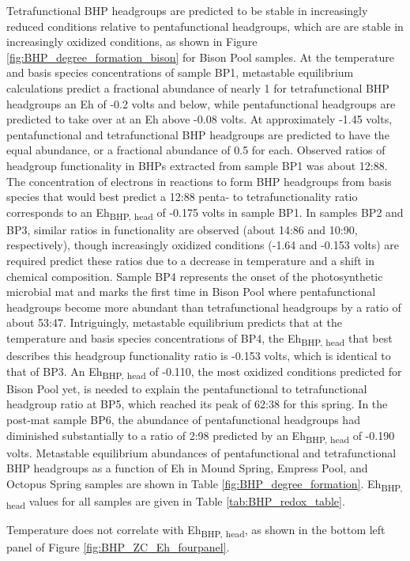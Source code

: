 Tetrafunctional BHP headgroups are predicted to be stable in increasingly reduced conditions relative to pentafunctional headgroups, which are are stable in increasingly oxidized conditions, as shown in Figure \ref{fig:BHP_degree_formation_bison} for Bison Pool samples. At the temperature and basis species concentrations of sample BP1, metastable equilibrium calculations predict a fractional abundance of nearly 1 for tetrafunctional BHP headgroups an Eh of -0.2 volts and below, while pentafunctional headgroups are predicted to take over at an Eh above -0.08 volts. At approximately -1.45 volts, pentafunctional and tetrafunctional BHP headgroups are predicted to have the equal abundance, or a fractional abundance of 0.5 for each. Observed ratios of headgroup functionality in BHPs extracted from sample BP1 was about 12:88. The concentration of electrons in reactions to form BHP headgroups from basis species that would best predict a 12:88 penta- to tetrafunctionality ratio corresponds to an Eh\textsubscript{BHP, head} of -0.175 volts in sample BP1. In samples BP2 and BP3, similar ratios in functionality are observed (about 14:86 and 10:90, respectively), though increasingly oxidized conditions (-1.64 and -0.153 volts) are required predict these ratios due to a decrease in temperature and a shift in chemical composition. Sample BP4 represents the onset of the photosynthetic microbial mat and marks the first time in Bison Pool where pentafunctional headgroups become more abundant than tetrafunctional headgroups by a ratio of about 53:47. Intriguingly, metastable equilibrium predicts that at the temperature and basis species concentrations of BP4, the Eh\textsubscript{BHP, head} that best describes this headgroup functionality ratio is -0.153 volts, which is identical to that of BP3. An Eh\textsubscript{BHP, head} of -0.110, the most oxidized conditions predicted for Bison Pool yet, is needed to explain the pentafunctional to tetrafunctional headgroup ratio at BP5, which reached its peak of 62:38 for this spring. In the post-mat sample BP6, the abundance of pentafunctional headgroups had diminished substantially to a ratio of 2:98 predicted by an Eh\textsubscript{BHP, head} of -0.190 volts. Metastable equilibrium abundances of pentafunctional and tetrafunctional BHP headgroups as a function of Eh in Mound Spring, Empress Pool, and Octopus Spring samples are shown in Table \ref{fig:BHP_degree_formation}. Eh\textsubscript{BHP, head} values for all samples are given in Table \ref{tab:BHP_redox_table}.

Temperature does not correlate with Eh\textsubscript{BHP, head}, as shown in the bottom left panel of Figure \ref{fig:BHP_ZC_Eh_fourpanel}.




